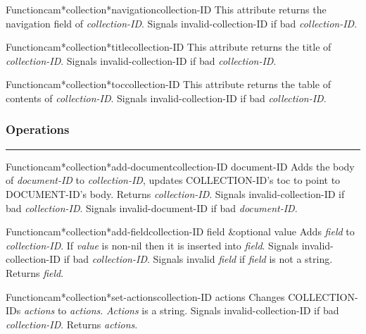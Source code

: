 \begin{functiondoc}{Function}{cam*collection*navigation}{collection-ID}
This attribute returns the navigation field of {\em collection-ID}.
Signals invalid-collection-ID if bad {\em collection-ID}.
\end{functiondoc}

\begin{functiondoc}{Function}{cam*collection*title}{collection-ID}
This attribute returns the title of {\em collection-ID}.
Signals invalid-collection-ID if bad {\em collection-ID}.
\end{functiondoc}

\begin{functiondoc}{Function}{cam*collection*toc}{collection-ID}
This attribute returns the table of contents of {\em collection-ID}.
Signals invalid-collection-ID if bad {\em collection-ID}.
\end{functiondoc}


\subsubsection*{Operations}
\par\vspace*{0.00in}\par\hrule\par\medskip\par


\begin{functiondoc}{Function}{cam*collection*add-document}{collection-ID document-ID}
Adds the body of {\em document-ID} to {\em collection-ID}, updates COLLECTION-ID's toc to
point to DOCUMENT-ID's body.
Returns {\em collection-ID}.
Signals invalid-collection-ID if bad {\em collection-ID}.
Signals invalid-document-ID if bad {\em document-ID}.
\end{functiondoc}

\begin{functiondoc}{Function}{cam*collection*add-field}{collection-ID field \&optional value}
Adds {\em field} to {\em collection-ID}.  If {\em value} is non-nil then it is inserted into
{\em field}.
Signals invalid-collection-ID if bad {\em collection-ID}.
Signals invalid {\em field} if {\em field} is not a string.
Returns {\em field}.
\end{functiondoc}

\begin{functiondoc}{Function}{cam*collection*set-actions}{collection-ID actions}
Changes COLLECTION-IDs {\em actions} to {\em actions}.
{\em Actions} is a string.
Signals invalid-collection-ID if bad {\em collection-ID}.
Returns {\em actions}.
\end{functiondoc}

